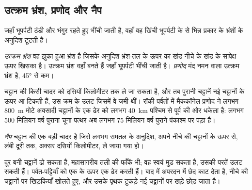 
\subsection{उत्क्रम भ्रंश, प्रणोद और नैप}

जहाँ भूपर्पटी ठंडी और भंगुर रहते हुए भींची जाती है, वहाँ वह खिंची भूपर्पटी के
 से भिन्न प्रकार के भ्रंशों के अनुदिश टूटती है।

\begin{definition}[उत्क्रम भ्रंश; प्रणोद]\label{def:g12:mountain-building:thrust}
\emph{उत्क्रम भ्रंश} वह झुका हुआ भ्रंश है जिसके अनुदिश
भ्रंश-तल के ऊपर का खंड नीचे के खंड के सापेक्ष ऊपर
खिसका है। उत्क्रम भ्रंश वहाँ बनते हैं जहाँ भूपर्पटी भींची जाती है।
\emph{प्रणोद} मंद नमन वाला उत्क्रम भ्रंश है, \ang{45} से
कम।
\end{definition}

 चट्टान की किसी चादर को दसियों किलोमीटर तक ले जा सकता है, और तब पुरानी
चट्टानें नई चट्टानों के ऊपर आ टिकती हैं, उस क्रम के उलट जिसमें वे
जमी थीं। रॉकी पर्वतों में मैककॉनेल प्रणोद ने लगभग \qty{800}{m} मोटे
अवसादी चट्टानों के एक ढेर को लगभग \qty{40}{km}
पश्चिम से पूर्व की ओर धकेला है: लगभग 500 मिलियन वर्ष पुराना चूना पत्थर अब लगभग
75 मिलियन वर्ष पुराने पंकाश्म पर पड़ा है।

\begin{definition}[नैप]\label{def:g12:mountain-building:nappe}
\emph{नैप} चट्टान की एक बड़ी चादर है जिसे लगभग समतल
 के अनुदिश, अपने नीचे की चट्टानों के ऊपर से, लंबी दूरी तक, अक्सर दसियों किलोमीटर,
ले जाया गया हो।
\end{definition}

 दूर बनी चट्टानें ढो सकता है, महासागरीय तली की फाँकें भी; वह
स्वयं मुड़ सकता है, उसकी परतें उलट सकती हैं। पर्वत-पट्टियाँ  को
एक के ऊपर एक ढेर करती हैं। बाद में अपरदन  में छेद काट देता है,
नीचे की चट्टानों पर खिड़कियाँ खोलते हुए, और उसके पृथक टुकड़े
नई चट्टानों पर खड़े छोड़ जाता है।

